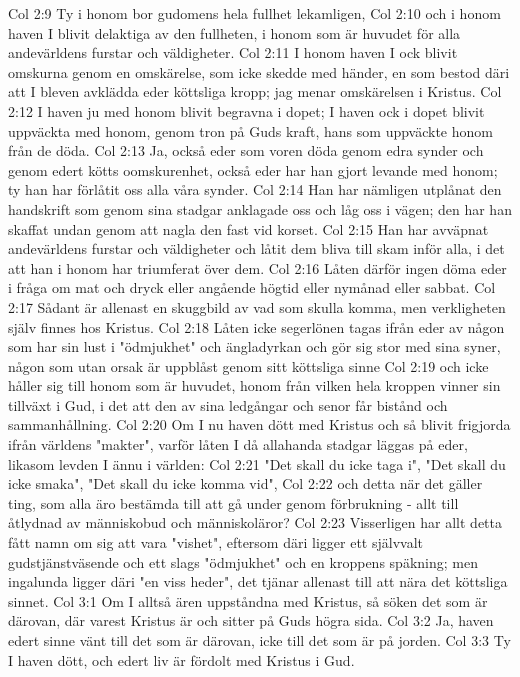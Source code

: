 Col 2:9  Ty i honom bor gudomens hela fullhet lekamligen,
Col 2:10  och i honom haven I blivit delaktiga av den fullheten, i honom som är huvudet för alla andevärldens furstar och väldigheter.
Col 2:11  I honom haven I ock blivit omskurna genom en omskärelse, som icke skedde med händer, en som bestod däri att I bleven avklädda eder köttsliga kropp; jag menar omskärelsen i Kristus.
Col 2:12  I haven ju med honom blivit begravna i dopet; I haven ock i dopet blivit uppväckta med honom, genom tron på Guds kraft, hans som uppväckte honom från de döda.
Col 2:13  Ja, också eder som voren döda genom edra synder och genom edert kötts oomskurenhet, också eder har han gjort levande med honom; ty han har förlåtit oss alla våra synder.
Col 2:14  Han har nämligen utplånat den handskrift som genom sina stadgar anklagade oss och låg oss i vägen; den har han skaffat undan genom att nagla den fast vid korset.
Col 2:15  Han har avväpnat andevärldens furstar och väldigheter och låtit dem bliva till skam inför alla, i det att han i honom har triumferat över dem.
Col 2:16  Låten därför ingen döma eder i fråga om mat och dryck eller angående högtid eller nymånad eller sabbat.
Col 2:17  Sådant är allenast en skuggbild av vad som skulla komma, men verkligheten själv finnes hos Kristus.
Col 2:18  Låten icke segerlönen tagas ifrån eder av någon som har sin lust i "ödmjukhet" och ängladyrkan och gör sig stor med sina syner, någon som utan orsak är uppblåst genom sitt köttsliga sinne
Col 2:19  och icke håller sig till honom som är huvudet, honom från vilken hela kroppen vinner sin tillväxt i Gud, i det att den av sina ledgångar och senor får bistånd och sammanhållning.
Col 2:20  Om I nu haven dött med Kristus och så blivit frigjorda ifrån världens "makter", varför låten I då allahanda stadgar läggas på eder, likasom levden I ännu i världen:
Col 2:21  "Det skall du icke taga i", "Det skall du icke smaka", "Det skall du icke komma vid",
Col 2:22  och detta när det gäller ting, som alla äro bestämda till att gå under genom förbrukning - allt till åtlydnad av människobud och människoläror?
Col 2:23  Visserligen har allt detta fått namn om sig att vara "vishet", eftersom däri ligger ett självvalt gudstjänstväsende och ett slags "ödmjukhet" och en kroppens späkning; men ingalunda ligger däri "en viss heder", det tjänar allenast till att nära det köttsliga sinnet.
Col 3:1  Om I alltså ären uppståndna med Kristus, så söken det som är därovan, där varest Kristus är och sitter på Guds högra sida.
Col 3:2  Ja, haven edert sinne vänt till det som är därovan, icke till det som är på jorden.
Col 3:3  Ty I haven dött, och edert liv är fördolt med Kristus i Gud.
